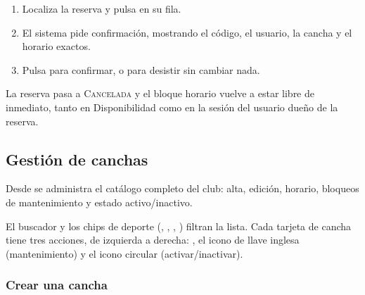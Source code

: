 \begin{enumerate}
  \item Localiza la reserva y pulsa  en su fila.
  \item El sistema pide confirmación, mostrando el código, el usuario, la
        cancha y el horario exactos.
\end{enumerate}


\begin{enumerate}
  \setcounter{enumi}{2}
  \item Pulsa  para confirmar, o 
        para desistir sin cambiar nada.
\end{enumerate}

La reserva pasa a \textsc{Cancelada} y el bloque horario vuelve a estar
libre de inmediato, tanto en Disponibilidad como en la sesión del usuario
dueño de la reserva.



\subsection{Gestión de canchas}
\label{sec:admin:canchas}

Desde  se administra el catálogo completo del club: alta,
edición, horario, bloqueos de mantenimiento y estado activo/inactivo.


El buscador y los chips de deporte (, ,
, ) filtran la lista. Cada tarjeta de cancha
tiene tres acciones, de izquierda a derecha: , el icono de
llave inglesa (mantenimiento) y el icono circular (activar/inactivar).

\subsubsection{Crear una cancha}

